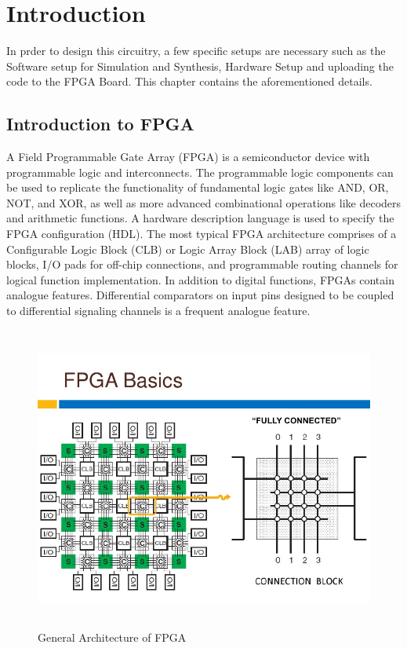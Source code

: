 \documentclass[12pt,a4paper]{article}
\begin{document}
\fancyfoot{}
\rfoot{\thepage}
\setcounter{page}{1}
\renewcommand{\baselinestretch}{1.5} %
\section{Introduction}
In prder to design this circuitry, a few specific setups are necessary such as the Software setup for Simulation and Synthesis, Hardware Setup and uploading the code to the FPGA Board. This chapter contains the aforementioned details.  \

\subsection{Introduction to FPGA }
A Field Programmable Gate Array (FPGA) is a semiconductor device with programmable logic and interconnects. The programmable logic components can be used to replicate the functionality of fundamental logic gates like AND, OR, NOT, and XOR, as well as more advanced combinational operations like decoders and arithmetic functions. A hardware description language is used to specify the FPGA configuration (HDL). The most typical FPGA architecture comprises of a Configurable Logic Block (CLB) or Logic Array Block (LAB) array of logic blocks, I/O pads for off-chip connections, and programmable routing channels for logical function implementation. In addition to digital functions, FPGAs contain analogue features. Differential comparators on input pins designed to be coupled to differential signaling channels is a frequent analogue feature.\\

\begin{figure}[H]
\centering
\includegraphics[height=10cm,width=11.5cm]{FPGA.jpg}
\caption{General Architecture of FPGA}
\label{General Architecture of FPGA}
\end{figure}
\newpage
\end{document}
